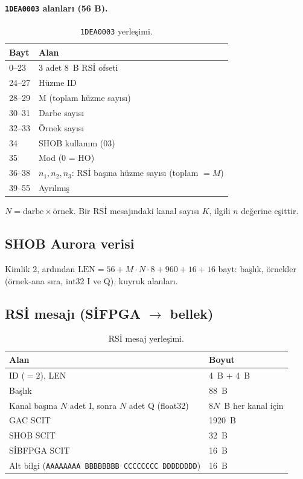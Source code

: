 \documentclass[11pt,a4paper]{article}
\newcommand{\kod}[1]{\texttt{#1}}
\begin{document}
\paragraph{\kod{1DEA0003} alanları (56 B).}

\begin{table}[h]
\centering
\begin{tabular}{@{}ll@{}}
\toprule
Bayt & Alan \\
\midrule
0--23 & 3 adet 8~B RSİ ofseti \\
24--27 & Hüzme ID \\
28--29 & M (toplam hüzme sayısı) \\
30--31 & Darbe sayısı \\
32--33 & Örnek sayısı \\
34 & SHOB kullanım (03) \\
35 & Mod (0 = HO) \\
36--38 & $n_1, n_2, n_3$: RSİ başına hüzme sayısı (toplam $=M$) \\
39--55 & Ayrılmış \\
\bottomrule
\end{tabular}
\caption{\kod{1DEA0003} yerleşimi.}
\end{table}

$N = \text{darbe} \times \text{örnek}$. Bir RSİ mesajındaki kanal sayısı $K$,
ilgili $n$ değerine eşittir.

\subsection{SHOB Aurora verisi}

Kimlik 2, ardından $\mathrm{LEN} = 56 + M\cdot N\cdot 8 + 960 + 16 + 16$ bayt:
başlık, örnekler (örnek-ana sıra, int32 I ve Q), kuyruk alanları.

\subsection{RSİ mesajı (SİFPGA $\to$ bellek)}

\begin{table}[h]
\centering
\begin{tabular}{@{}ll@{}}
\toprule
Alan & Boyut \\
\midrule
ID ($=2$), LEN & 4~B + 4~B \\
Başlık & 88~B \\
Kanal başına $N$ adet I, sonra $N$ adet Q (float32) & $8N$~B her kanal için \\
GAC SCIT & 1920~B \\
SHOB SCIT & 32~B \\
SİBFPGA SCIT & 16~B \\
Alt bilgi (\kod{AAAAAAAA BBBBBBBB CCCCCCCC DDDDDDDD}) & 16~B \\
\bottomrule
\end{tabular}
\caption{RSİ mesaj yerleşimi.}
\end{table}
\end{document}
